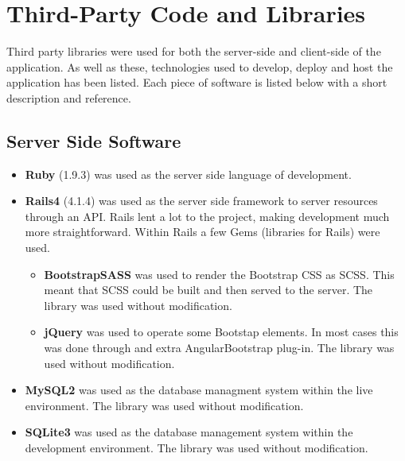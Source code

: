 \chapter{Third-Party Code and Libraries}

Third party libraries were used for both the server-side and client-side of the application. As well as these, technologies used to develop, deploy and host the application has been listed. Each piece of software is listed below with a short description and reference.

\section{Server Side Software}
\begin{itemize}
	\item \textbf{Ruby} (1.9.3) \cite{Ruby} was used as the server side language of development.
	\item \textbf{Rails4} (4.1.4) \cite{Rails} was used as the server side framework to server resources through an API. Rails lent a lot to the project, making development much more straightforward. Within Rails a few Gems (libraries for Rails) were used.
	\begin{itemize}
		\item \textbf{BootstrapSASS} \cite{BootstrapSASS} was used to render the Bootstrap CSS as SCSS. This meant that SCSS could be built and then served to the server. The library was used without modification.
		\item \textbf{jQuery} \cite{JQuery} was used to operate some Bootstap elements. In most cases this was done through and extra AngularBootstrap plug-in. The library was used without modification.
	\end{itemize}
	\item \textbf{MySQL2} \cite{MySQL2} was used as the database managment system within the live environment. The library was used without modification.
	\item \textbf{SQLite3} \cite{SQLite3} was used as the database management system within the development environment. The library was used without modification.
\end{itemize}

